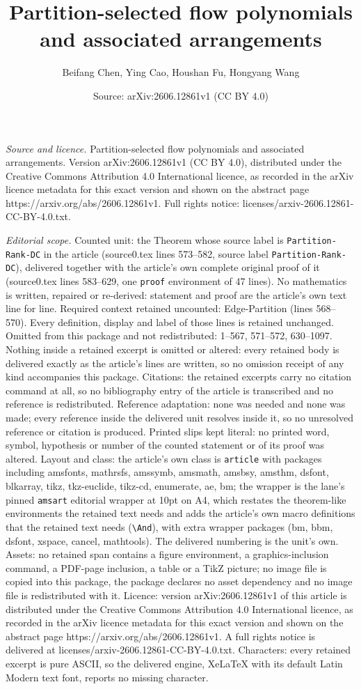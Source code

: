 \documentclass[10pt,a4paper]{amsart}
\title[Partition-selected flow polynomials and associated arrangeme]{Partition-selected flow polynomials and associated arrangements}
\author{Beifang Chen, Ying Cao, Houshan Fu, Hongyang Wang}
\date{Source: arXiv:2606.12861v1 (CC BY 4.0)}
\begin{document}
\maketitle

\noindent\emph{Source and licence.} Partition-selected flow polynomials and associated arrangements. Version arXiv:2606.12861v1 (CC BY 4.0), distributed under the Creative Commons Attribution 4.0 International licence, as recorded in the arXiv licence metadata for this exact version and shown on the abstract page https://arxiv.org/abs/2606.12861v1. Full rights notice: licenses/arxiv-2606.12861-CC-BY-4.0.txt.\par\smallskip

\noindent\textit{Editorial scope.} Counted unit: the Theorem whose source label is \texttt{Partition-Rank-DC} in the article (source0.tex lines 573--582, source label \texttt{Partition-Rank-DC}), delivered together with the article's own complete original proof of it (source0.tex lines 583--629, one \texttt{proof} environment of 47 lines). No mathematics is written, repaired or re-derived: statement and proof are the article's own text line for line. Required context retained uncounted: Edge-Partition (lines 568--570). Every definition, display and label of those lines is retained unchanged. Omitted from this package and not redistributed: 1--567, 571--572, 630--1097. Nothing inside a retained excerpt is omitted or altered: every retained body is delivered exactly as the article's lines are written, so no omission receipt of any kind accompanies this package. Citations: the retained excerpts carry no citation command at all, so no bibliography entry of the article is transcribed and no reference is redistributed. Reference adaptation: none was needed and none was made; every reference inside the delivered unit resolves inside it, so no unresolved reference or citation is produced. Printed slips kept literal: no printed word, symbol, hypothesis or number of the counted statement or of its proof was altered. Layout and class: the article's own class is \texttt{article} with packages including amsfonts, mathrsfs, amssymb, amsmath, amsbsy, amsthm, dsfont, blkarray, tikz, tkz-euclide, tikz-cd, enumerate, ae, bm; the wrapper is the lane's pinned \texttt{amsart} editorial wrapper at 10pt on A4, which restates the theorem-like environments the retained text needs and adds the article's own macro definitions that the retained text needs (\texttt{\textbackslash And}), with extra wrapper packages (bm, bbm, dsfont, xspace, cancel, mathtools). The delivered numbering is the unit's own. Assets: no retained span contains a figure environment, a graphics-inclusion command, a PDF-page inclusion, a table or a TikZ picture; no image file is copied into this package, the package declares no asset dependency and no image file is redistributed with it. Licence: version arXiv:2606.12861v1 of this article is distributed under the Creative Commons Attribution 4.0 International licence, as recorded in the arXiv licence metadata for this exact version and shown on the abstract page https://arxiv.org/abs/2606.12861v1. A full rights notice is delivered at licenses/arxiv-2606.12861-CC-BY-4.0.txt. Characters: every retained excerpt is pure ASCII, so the delivered engine, XeLaTeX with its default Latin Modern text font, reports no missing character.
\end{document}
